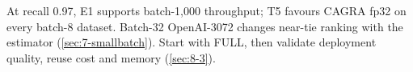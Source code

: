 At recall 0.97, E1 supports batch-1,000 throughput; T5 favours CAGRA fp32 on every batch-8 dataset. Batch-32 OpenAI-3072 changes near-tie ranking with the estimator (\cref{sec:7-smallbatch}). Start with FULL, then validate deployment quality, reuse cost and memory (\cref{sec:8-3}).